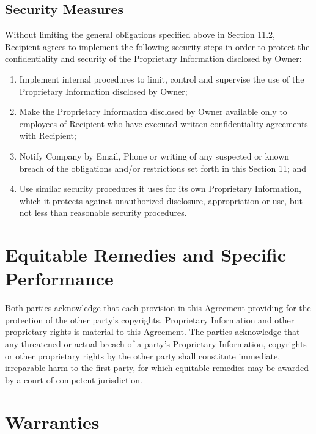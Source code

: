\documentclass[letterpaper,10pt,english]{sphinxmanual}
\begin{document}
\subsection{Security Measures}
\label{\detokenize{nondisclosure:security-measures}}
Without limiting the general obligations specified above in
Section 11.2, Recipient agrees to implement the following security steps in order to protect the confidentiality and security of the Proprietary Information disclosed by Owner:
\begin{enumerate}
\item {} 
Implement internal procedures to limit, control and supervise the use of the Proprietary Information disclosed by Owner;

\item {} 
Make the Proprietary Information disclosed by Owner available only to employees of Recipient who have executed written confidentiality agreements with Recipient;

\item {} 
Notify Company by Email, Phone or writing of any suspected or known breach of the obligations and/or restrictions set forth in this Section 11; and

\item {} 
Use similar security procedures it uses for its own Proprietary Information, which it protects against unauthorized disclosure, appropriation or use, but not less than reasonable security procedures.

\end{enumerate}


\section{Equitable Remedies and Specific Performance}
\label{\detokenize{remedyandperformance:equitable-remedies-and-specific-performance}}\label{\detokenize{remedyandperformance::doc}}
Both parties acknowledge that each provision in this Agreement providing for the protection of the other party’s copyrights, Proprietary Information and other proprietary rights is material to this Agreement. The parties acknowledge that any threatened or actual breach of a party’s Proprietary Information, copyrights or other proprietary rights by the other party shall constitute immediate, irreparable harm to the first party, for which equitable remedies may be awarded by a court of competent jurisdiction.


\section{Warranties}
\label{\detokenize{warranties:warranties}}\label{\detokenize{warranties::doc}}
\end{document}
